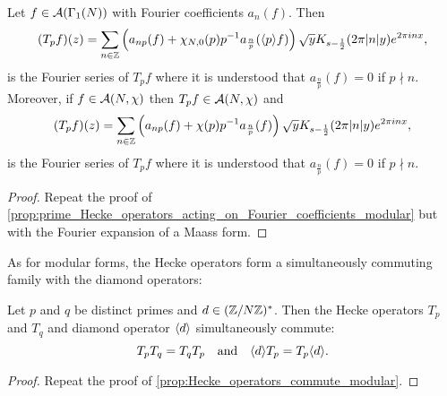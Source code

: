       \begin{proposition}\label{prop:prime_Hecke_operators_acting_on_Fourier_coefficients_Maass}
        Let $f \in \mathcal{A}(\Gamma_{1}(N))$ with Fourier coefficients $a_{n}(f)$. Then
        \[
          (T_{p}f)(z) = \sum_{n \in \mathbb{Z}}\left(a_{np}(f)+\chi_{N,0}(p)p^{-1}a_{\frac{n}{p}}(\langle p\rangle f)\right)\sqrt{y}K_{s-\frac{1}{2}}(2\pi|n|y)e^{2\pi inx},
        \]
        is the Fourier series of $T_{p}f$ where it is understood that $a_{\frac{n}{p}}(f) = 0$ if $p \nmid n$. Moreover, if $f \in \mathcal{A}(N,\chi)$ then $T_{p}f \in \mathcal{A}(N,\chi)$ and
        \[
          (T_{p}f)(z) = \sum_{n \in \mathbb{Z}}\left(a_{np}(f)+\chi(p)p^{-1}a_{\frac{n}{p}}(f)\right)\sqrt{y}K_{s-\frac{1}{2}}(2\pi|n|y)e^{2\pi inx},
        \]
        is the Fourier series of $T_{p}f$ where it is understood that $a_{\frac{n}{p}}(f) = 0$ if $p \nmid n$.
      \end{proposition}
      \begin{proof}
        Repeat the proof of \cref{prop:prime_Hecke_operators_acting_on_Fourier_coefficients_modular} but with the Fourier expansion of a Maass form.
      \end{proof}

      As for modular forms, the Hecke operators form a simultaneously commuting family with the diamond operators:

      \begin{proposition}\label{prop:Hecke_operators_commute_Maass}
        Let $p$ and $q$ be distinct primes and $d \in (\mathbb{Z}/N\mathbb{Z})^{\ast}$. Then the Hecke operators $T_{p}$ and $T_{q}$ and diamond operator $\langle d\rangle$ simultaneously commute:
        \[
          T_{p}T_{q} = T_{q}T_{p} \quad \text{and} \quad \langle d\rangle T_{p} = T_{p}\langle d\rangle.
        \]
      \end{proposition}
      \begin{proof}
        Repeat the proof of \cref{prop:Hecke_operators_commute_modular}.
      \end{proof}

